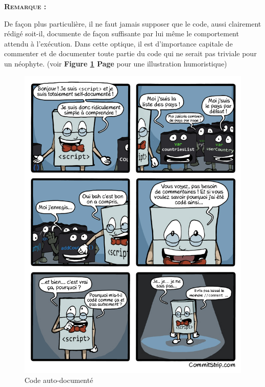 \smallskip
\begin{large}
\textbf{\textsc{Remarque :}}
\end{large}
De façon plus particulière, il ne faut jamais supposer que le code, aussi clairement rédigé soit-il, documente de façon suffisante par lui même le comportement attendu à l'exécution. Dans cette optique, il est d'importance capitale de commenter et de documenter toute partie du code qui ne serait pas triviale pour un néophyte. (voir \textbf{Figure \ref{self-documented-code} Page \pageref{self-documented-code}} pour une illustration humoristique)
\begin{figure}\centering
\includegraphics[scale=0.6]{pictures/CommitStrip_self-documented.jpg}
\caption{Code auto-documenté}
\label{self-documented-code}
\end{figure}

\medskip

